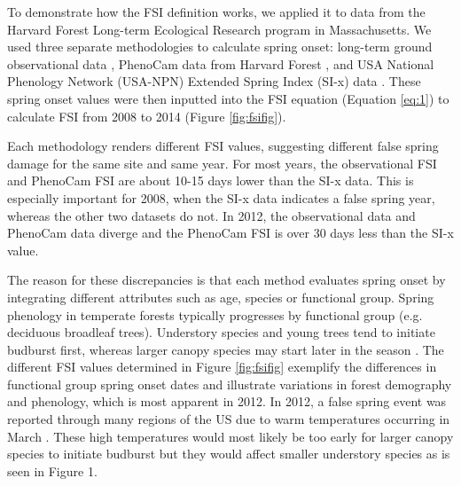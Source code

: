 \documentclass{article}\usepackage[]{graphicx}\usepackage[]{color}
\begin{document}
To demonstrate how the FSI definition works, we applied it to data from the Harvard Forest Long-term Ecological Research program in Massachusetts. We used three separate methodologies to calculate spring onset: long-term ground observational data \citep{Okeefe2014}, PhenoCam data from Harvard Forest \citep{Richardson2015}, and USA National Phenology Network (USA-NPN) Extended Spring Index (SI-x) data \citep{USA-NPN2016}. These spring onset values were then inputted into the FSI equation (Equation \ref{eq:1}) to calculate FSI from 2008 to 2014 (Figure \ref{fig:fsifig}). 

Each methodology renders different FSI values, suggesting different false spring damage for the same site and same year. For most years, the observational FSI and PhenoCam FSI are about 10-15 days lower than the SI-x data. This is especially important for 2008, when the SI-x data indicates a false spring year, whereas the other two datasets do not. In 2012, the observational data and PhenoCam data diverge and the PhenoCam FSI is over 30 days less than the SI-x value.

The reason for these discrepancies is that each method evaluates spring onset by integrating different attributes such as age, species or functional group. Spring phenology in temperate forests typically progresses by functional group (e.g. deciduous broadleaf trees). Understory species and young trees tend to initiate budburst first, whereas larger canopy species may start later in the season \citep{Richardson2009, Xin2016}. The different FSI values determined in Figure \ref{fig:fsifig} exemplify the differences in functional group spring onset dates and illustrate variations in forest demography and phenology, which is most apparent in 2012. In 2012, a false spring event was reported through many regions of the US due to warm temperatures occurring in March \citep{Ault2015}. These high temperatures would most likely be too early for larger canopy species to initiate budburst but they would affect smaller understory species as is seen in Figure 1. 
\end{document}
